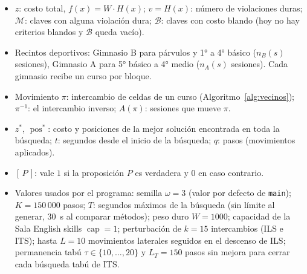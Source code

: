 \documentclass{article}
\newcommand{\clave}[1]{\mathsf{#1}}          %
\begin{document}
\begin{itemize}
\begin{itemize}
              \item $\clave{R}(r, s)$: sesiones que usan la sala de capacidad limitada $r$ en el bloque $s$.
          \end{itemize}
    \item $z$: costo total, $f(x) = W \cdot H(x)$; $v = H(x)$: número de violaciones duras;
          $\mathcal{M}$: claves con alguna violación dura; $\mathcal{B}$: claves con costo blando
          (hoy no hay criterios blandos y $\mathcal{B}$ queda vacío).
    \item Recintos deportivos: Gimnasio B para párvulos y 1° a 4° básico ($n_B(s)$ sesiones),
          Gimnasio A para 5° básico a 4° medio ($n_A(s)$ sesiones). Cada gimnasio recibe un curso
          por bloque.
    \item Movimiento $\pi$: intercambio de celdas de un curso (Algoritmo~\ref{alg:vecinos});
          $\pi^{-1}$: el intercambio inverso; $A(\pi)$: sesiones que mueve $\pi$.
    \item $z^*$, $\operatorname{pos}^*$: costo y posiciones de la mejor solución encontrada en toda
          la búsqueda; $t$: segundos desde el inicio de la búsqueda; $q$: pasos (movimientos aplicados).
    \item $[\,P\,]$: vale $1$ si la proposición $P$ es verdadera y $0$ en caso contrario.
    \item Valores usados por el programa: semilla $\omega = 3$ (valor por defecto de \texttt{main});
          $K = 150\,000$ pasos; $T$: segundos máximos de la búsqueda (sin límite al generar,
          30~s al comparar métodos); peso duro $W = 1000$;
          capacidad de la Sala English skills $\operatorname{cap} = 1$;
          perturbación de $k = 15$ intercambios (ILS e ITS);
          hasta $L = 10$ movimientos laterales seguidos en el descenso de ILS;
          permanencia tabú $\tau \in \{10, \dots, 20\}$ y $L_T = 150$ pasos sin mejora para cerrar
          cada búsqueda tabú de ITS.
\end{itemize}
\end{document}
